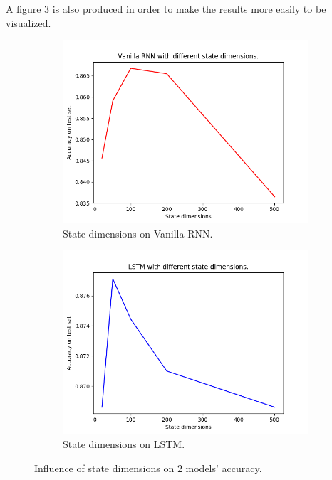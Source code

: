 \documentclass[12pt,letterpaper]{article}
\begin{document}
A figure \ref{fig:final acc} is also produced in order to make the results more easily to be visualized.
\begin{figure}[h]
    \begin{subfigure}{0.49\textwidth}
    \includegraphics[width=\linewidth]{vanilla_final_acc.png}
    \caption{\small State dimensions on Vanilla RNN.} \label{fig:e}
    \end{subfigure}\hspace*{\fill}
    \begin{subfigure}{0.49\textwidth}
    \includegraphics[width=\linewidth]{lstm_final_acc.png}
    \caption{\small State dimensions on LSTM.} \label{fig:f}
    \end{subfigure}
    \caption{Influence of state dimensions on $2$ models' accuracy.}
    \label{fig:final acc}
\end{figure}
\end{document}

